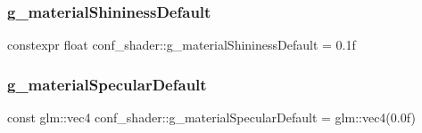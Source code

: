 \subsubsection{\texorpdfstring{g\+\_\+material\+Shininess\+Default}{g\_materialShininessDefault}}
{\footnotesize\ttfamily constexpr float conf\+\_\+shader\+::g\+\_\+material\+Shininess\+Default = 0.\+1f}

\mbox{\label{namespaceconf__shader_abce3f1ff56dd74a9e131c515c25e934d}} 
\subsubsection{\texorpdfstring{g\+\_\+material\+Specular\+Default}{g\_materialSpecularDefault}}
{\footnotesize\ttfamily const glm\+::vec4 conf\+\_\+shader\+::g\+\_\+material\+Specular\+Default = glm\+::vec4(0.\+0f)}

